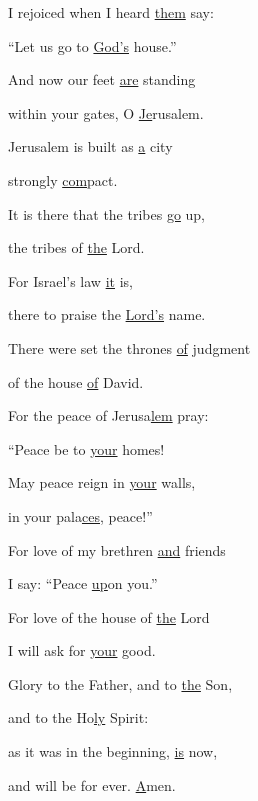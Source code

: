 \noindent I rejoiced when I heard \uline{them} say: ~\GreStar{}~\nopagebreak

“Let us go to \uline{God’s} house.”

\noindent And now our feet \uline{are} standing ~\GreStar{}~\nopagebreak

within your gates, O \uline{Je}rusalem.

\noindent Jerusalem is built as \uline{a} city ~\GreStar{}~\nopagebreak

strongly \uline{com}pact.

\noindent It is there that the tribes \uline{go} up, ~\GreStar{}~\nopagebreak

the tribes of \uline{the} Lord.

\noindent For Israel’s law \uline{it} is, ~\GreStar{}~\nopagebreak

there to praise the \uline{Lord’s} name.

\noindent There were set the thrones \uline{of} judgment ~\GreStar{}~\nopagebreak

of the house \uline{of} David.

\noindent For the peace of Jerusa\uline{lem} pray: ~\GreStar{}~\nopagebreak

“Peace be to \uline{your} homes!

\noindent May peace reign in \uline{your} walls, ~\GreStar{}~\nopagebreak

in your pala\uline{ces,} peace!”

\noindent For love of my brethren \uline{and} friends ~\GreStar{}~\nopagebreak

I say: “Peace \uline{up}on you.”

\noindent For love of the house of \uline{the} Lord ~\GreStar{}~\nopagebreak

I will ask for \uline{your} good.

\noindent Glory to the Father, and to \uline{the} Son,~\GreStar{}~\nopagebreak

and to the Ho\uline{ly} Spirit:

\noindent as it was in the beginning, \uline{is} now,~\GreStar{}~\nopagebreak

and will be for ever. \uline{A}men.

